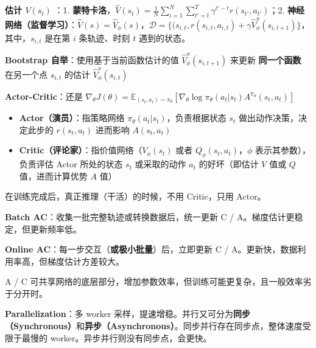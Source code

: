 \documentclass[
  8pt]{extarticle}
\providecommand{\tightlist}{%
  \setlength{\itemsep}{0pt}\setlength{\parskip}{0pt}}
\begin{document}
\begin{multicols*}{4}
\textbf{估计 \(V(s_t)\)} ：1.
\textbf{蒙特卡洛}，\(\hat{V}(s_t) = \frac{1}{N} \sum_{i=1}^{N} \sum_{t'=t}^{T} \gamma^{t' - t} r(s_{t'}, a_{t'})\)；2.
\textbf{神经网络（监督学习）}：\(\hat{V}(s) = \hat{V}_{\phi}(s)\)，\(\mathcal{D} = \{ (s_{i,t}, r(s_{i,t}, a_{i,t}) + \gamma \hat{V}_{\phi}^{\pi}(s_{i,t+1}) \}\)，其中，\(s_{i,t}\)
是在第 \(i\) 条轨迹、时刻 \(t\) 遇到的状态。

\textbf{Bootstrap 自举}：使用基于当前函数估计的值
\(\hat{V}_{\phi}^{\pi}(s_{i,t+1})\) 来更新 \textbf{同一个函数}
在另一个点 \(s_{i,t}\) 的估计 \(\hat{V}_{\phi}^{\pi}(s_{i,t})\)

\textbf{Actor-Critic}：还是
\(\nabla_\theta J(\theta) = \mathbb{E}_{(s_t, a_t) \sim \pi_\theta} [ \nabla_\theta \log \pi_\theta(a_t | s_t) A^{\pi_\theta}(s_t, a_t) ]\)

\begin{itemize}
\tightlist
\item
  \textbf{Actor（演员）}：指策略网络
  \(\pi_\theta(a_t|s_t)\)，负责根据状态 \(s_t\) 做出动作决策，决定此步的
  \(r(s_t, a_t)\) 进而影响 \(A(s_t, a_t)\)
\item
  \textbf{Critic（评论家）}：指价值网络（\(V_{\phi}(s_t)\) 或者
  \(Q_{\phi}(s_t, a_t)\)，\(\phi\) 表示其参数），负责评估 Actor
  所处的状态 \(s_t\) 或采取的动作 \(a_t\) 的好坏（即估计 \(V\) 值或
  \(Q\) 值，进而计算优势 \(A\) 值）
\end{itemize}

在训练完成后，真正推理（干活）的时候，不用 Critic，只用 Actor。

\textbf{Batch AC}：收集一批完整轨迹或转换数据后，统一更新 C /
A。梯度估计更稳定，但更新频率低。

\textbf{Online AC}：每一步交互（\textbf{或极小批量}）后，立即更新 C /
A。更新快，数据利用率高，但梯度估计方差较大。

A / C
可共享网络的底层部分，增加参数效率，但训练可能更复杂，且一般效率劣于分开时。

\textbf{Parallelization}：多 worker
采样，提速增稳。并行又可分为\textbf{同步（Synchronous）}和\textbf{异步（Asynchronous）}。同步并行存在同步点，整体速度受限于最慢的
worker。异步并行则没有同步点，会更快。

\end{multicols*}
\end{document}
